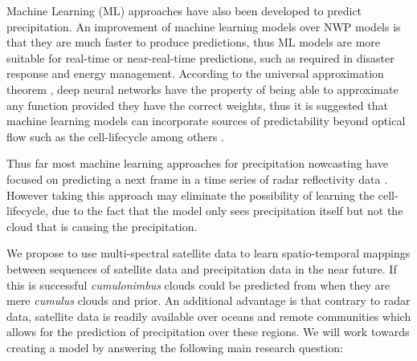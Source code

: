 \documentclass[acmtog, authorversion]{acmart}
\begin{document}
Machine Learning (\textsc{ML}) approaches have also been developed to predict precipitation. An improvement of machine learning models over \textsc{NWP} models is that they are much faster to produce predictions, thus ML models are more suitable for real-time or near-real-time predictions, such as required in disaster response and energy management. According to the universal approximation theorem \cite{cybenko-1989}, deep neural networks have the property of being able to approximate any function provided they have the correct weights, thus it is suggested that machine learning models can incorporate sources of predictability beyond optical flow such as the cell-lifecycle among others \cite{prudden2020review}.
\medskip

Thus far most machine learning approaches for precipitation nowcasting have focused on predicting a next frame in a time series of radar reflectivity data \cite{shi2017deep, convlstm, rainet}. However taking this approach may eliminate the possibility of learning the cell-lifecycle, due to the fact that the model only sees precipitation itself but not the cloud that is causing the precipitation.
\medskip


We propose to use multi-spectral satellite data to learn spatio-temporal mappings between sequences of satellite data and precipitation data in the near future. If this is successful \textit{cumulonimbus} clouds could be predicted from when they are mere \textit{cumulus} clouds and prior. An additional advantage is that contrary to radar data, satellite data is readily available over oceans and remote communities which allows for the prediction of precipitation over these regions. We will work towards creating a model by answering the following main research question:
\smallskip

\end{document}
